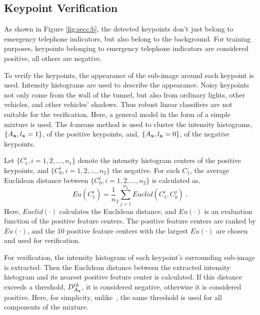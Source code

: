 \subsection{Keypoint Verification}


As shown in Figure \ref{fig:secc:b}, the detected keypoints don't just belong to emergency telephone indicators, but also belong to the background. For training purposes, keypoints belonging to emergency telephone indicators are considered  positive, all others are negative.

To verify the keypoints, the appearance of the sub-image around each keypoint is used. Intensity histograms are used to describe the appearance. Noisy keypoints not only come from the wall of the tunnel, but also from ordinary lights, other vehicles, and other vehicles' shadows. Thus robust linear classifiers are not suitable for the verification. Here, a general model in the form of a simple mixture is used. The \emph{k}-means method is used to cluster the intensity histograms, $\{A_{\bf{x}},l_{\bf{x}}=1\}$, of the positive keypoints, and, $\{A_{\bf{x}},l_{\bf{x}}=0\}$,  of
the negative keypoints.

Let $\{C_1^i,i=1,2,...,n_1\}$ denote the intensity histogram centers of the positive keypoints, and $\{C_0^i,i=1,2,...,n_2\}$ the negative. For each $C_1$, the average Euclidean distance between $\{C_0^i,i=1,2,...,n_2\}$ is calculated as,
\begin{equation}
Eu(C_1^i)={\frac 1 n_2}\sum\limits^{n_2}_{j=1}Euclid(C_1^i,C_0^j)\;.
\label{eq2}
\end{equation}
Here, $Euclid(\cdot)$ calculates the Euclidean distance, and $Eu(\cdot)$ is an evaluation function of the positive feature centers. The positive feature centers are ranked by $Eu(\cdot)$, and the 10 positive feature centers with the largest $Eu(\cdot)$ are chosen and used for verification.

For verification, the intensity histogram of each keypoint's surrounding sub-image is extracted. Then the Euclidean distance between the extracted intensity histogram and its nearest positive feature center is calculated. If this distance exceeds a threshold, $D^{th}_{A_{\bf{x}}}$, it is considered negative, otherwise it is considered positive. Here, for simplicity, unlike~\citep{ac33}, the same threshold is used for all components of the mixture.


